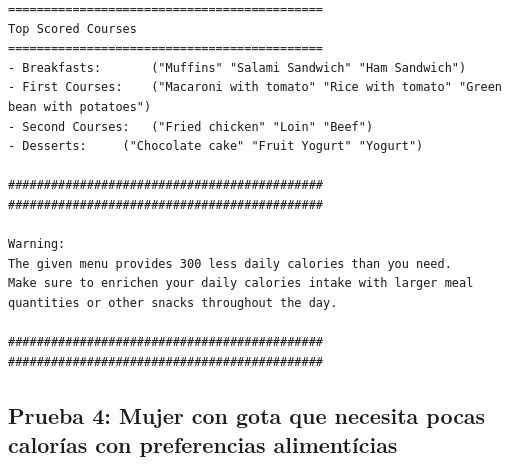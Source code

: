 \documentclass[12]{article}
\begin{document}
\begin{lstlisting}
============================================
Top Scored Courses
============================================
- Breakfasts:		("Muffins" "Salami Sandwich" "Ham Sandwich")
- First Courses:	("Macaroni with tomato" "Rice with tomato" "Green bean with potatoes")
- Second Courses:	("Fried chicken" "Loin" "Beef")
- Desserts:		("Chocolate cake" "Fruit Yogurt" "Yogurt")

############################################
############################################

Warning:
The given menu provides 300 less daily calories than you need.
Make sure to enrichen your daily calories intake with larger meal quantities or other snacks throughout the day.

############################################
############################################
\end{lstlisting}

\subsection{Prueba 4: Mujer con gota que necesita pocas calorías con preferencias alimentícias}
\end{document}
